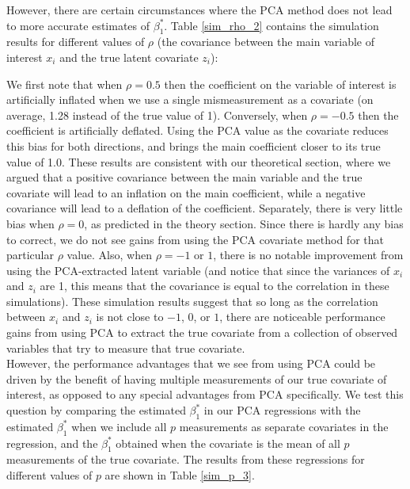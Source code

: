 \documentclass[12pt]{article}
\begin{document}
        However, there are certain circumstances where the PCA method does not lead to more accurate estimates of $\beta_1^*$. Table \ref{sim_rho_2} contains the simulation results for different values of $\rho$ (the covariance between the main variable of interest $x_i$ and the true latent covariate $z_i$):

        \clearpage

        

        We first note that when $\rho = 0.5$ then the coefficient on the variable of interest is artificially inflated when we use a single mismeasurement as a covariate (on average, 1.28 instead of the true value of 1). Conversely, when $\rho = -0.5$ then the coefficient is artificially deflated. Using the PCA value as the covariate reduces this bias for both directions, and brings the main coefficient closer to its true value of 1.0. These results are consistent with our theoretical section, where we argued that a positive covariance between the main variable and the true covariate will lead to an inflation on the main coefficient, while a negative covariance will lead to a deflation of the coefficient. Separately, there is very little bias when $\rho = 0$, as predicted in the theory section. Since there is hardly any bias to correct, we do not see gains from using the PCA covariate method for that particular $\rho$ value. Also, when $\rho = -1$ or $1$, there is no notable improvement from using the PCA-extracted latent variable (and notice that since the variances of $x_i$ and $z_i$ are 1, this means that the covariance is equal to the correlation in these simulations). These simulation results suggest that so long as the correlation between $x_i$ and $z_i$ is not close to $-1$, $0$, or $1$, there are noticeable performance gains from using PCA to extract the true covariate from a collection of observed variables that try to measure that true covariate.\\
        
        However, the performance advantages that we see from using PCA could be driven by the benefit of having multiple measurements of our true covariate of interest, as opposed to any special advantages from PCA specifically. We test this question by comparing the estimated $\beta_1^*$ in our PCA regressions with the estimated $\beta_1^*$ when we include all $p$ measurements as separate covariates in the regression, and the $\beta_1^*$ obtained when the covariate is the mean of all $p$ measurements of the true covariate. The results from these regressions for different values of $p$ are shown in Table \ref{sim_p_3}.
\end{document}
